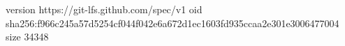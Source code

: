 version https://git-lfs.github.com/spec/v1
oid sha256:f966c245a57d5254cf044f042e6a672d1ec1603fd935ccaa2e301e3006477004
size 34348

